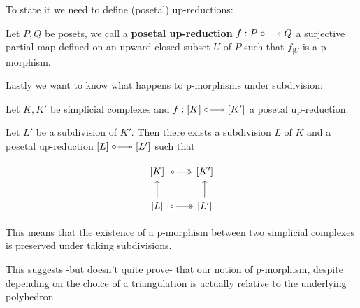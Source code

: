 To state it we need to define (posetal) up-reductions:
\begin{definition}
    Let $P,Q$ be posets, we call a \textbf{posetal up-reduction} $f:P\upred Q$ a surjective partial map 
    defined on an upward-closed subset $U$ of $P$ such that $f_{|U}$ is a p-morphism.
\end{definition}

Lastly we want to know what happens to p-morphisms under subdivision:
\begin{lemma} \label{extension}
    Let $K,K'$ be simplicial complexes and $f:[K]\upred [K']$ a posetal up-reduction.

    Let $L'$ be a subdivision of $K'$. Then there exists a subdivision $L$ of $K$ and a posetal up-reduction $[L]\upred [L']$ such that

    \[\begin{tikzcd}[ampersand replacement=\&]
	{[K]} \& {[K']} \\
	{[L]} \& {[L']}
	\arrow["\circ"{description, pos=0.17}, from=1-1, to=1-2, two heads]
	\arrow[from=2-1, to=1-1]
	\arrow["\circ"{description, pos=0.17}, from=2-1, to=2-2, two heads]
	\arrow[from=2-2, to=1-2]
\end{tikzcd}\]
\end{lemma}

This means that the existence of a p-morphism between two simplicial complexes is preserved under taking subdivisions.

This suggests -but doesn't quite prove- that our notion of p-morphism,
despite depending on the choice of a triangulation is 
actually relative to the underlying polyhedron.

